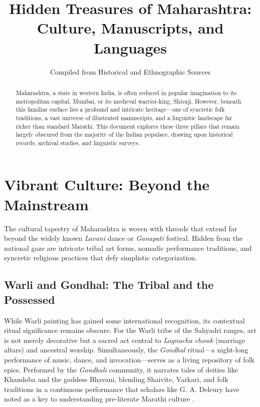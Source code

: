 \documentclass{article}
\begin{document}
\title{\textbf{Hidden Treasures of Maharashtra: Culture, Manuscripts, and Languages}}
\author{Compiled from Historical and Ethnographic Sources}
\date{}
\maketitle

\begin{abstract}
Maharashtra, a state in western India, is often reduced in popular imagination to its metropolitan capital, Mumbai, or its medieval warrior-king, Shivaji. However, beneath this familiar surface lies a profound and intricate heritage—one of syncretic folk traditions, a vast universe of illustrated manuscripts, and a linguistic landscape far richer than standard Marathi. This document explores these three pillars that remain largely obscured from the majority of the Indian populace, drawing upon historical records, archival studies, and linguistic surveys.
\end{abstract}

\section{Vibrant Culture: Beyond the Mainstream}
The cultural tapestry of Maharashtra is woven with threads that extend far beyond the widely known \textit{Lavani} dance or \textit{Ganapati} festival. Hidden from the national gaze are intricate tribal art forms, nomadic performance traditions, and syncretic religious practices that defy simplistic categorization.

\subsection{Warli and Gondhal: The Tribal and the Possessed}
While Warli painting has gained some international recognition, its contextual ritual significance remains obscure. For the Warli tribe of the Sahyadri ranges, art is not merely decorative but a sacred act central to \textit{Lagnacha chowk} (marriage altars) and ancestral worship. Simultaneously, the \textit{Gondhal} ritual—a night-long performance of music, dance, and invocation—serves as a living repository of folk epics. Performed by the \textit{Gondhali} community, it narrates tales of deities like Khandoba and the goddess Bhavani, blending Shaivite, Varkari, and folk traditions in a continuous performance that scholars like G. A. Deleury have noted as a key to understanding pre-literate Marathi culture \cite{deleury}.
\end{document}
